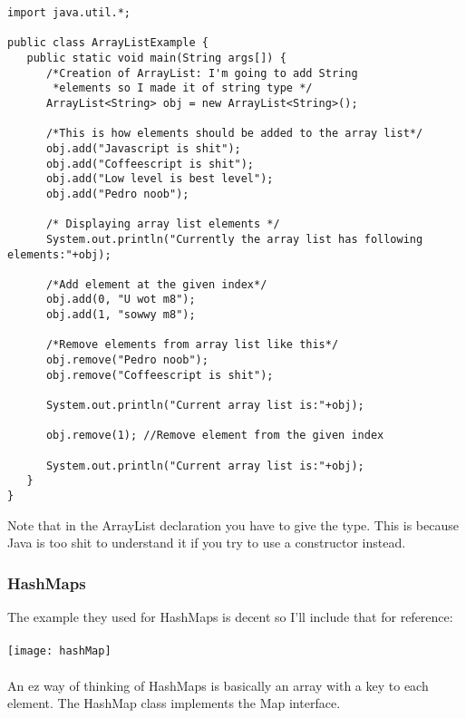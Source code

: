 \documentclass{article}
\begin{document}
\begin{lstlisting}
import java.util.*;

public class ArrayListExample {
   public static void main(String args[]) {
      /*Creation of ArrayList: I'm going to add String
       *elements so I made it of string type */
	  ArrayList<String> obj = new ArrayList<String>();

	  /*This is how elements should be added to the array list*/
	  obj.add("Javascript is shit");
	  obj.add("Coffeescript is shit");
	  obj.add("Low level is best level");
	  obj.add("Pedro noob");

	  /* Displaying array list elements */
	  System.out.println("Currently the array list has following elements:"+obj);

	  /*Add element at the given index*/
	  obj.add(0, "U wot m8");
	  obj.add(1, "sowwy m8");

	  /*Remove elements from array list like this*/
	  obj.remove("Pedro noob");
	  obj.remove("Coffeescript is shit");

	  System.out.println("Current array list is:"+obj);

	  obj.remove(1); //Remove element from the given index

	  System.out.println("Current array list is:"+obj);
   }
}
\end{lstlisting}

Note that in the ArrayList declaration you have to give the type. This is because Java is too shit to understand it if you try to use a constructor instead. 
\subsubsection{HashMaps}
The example they used for HashMaps is decent so I'll include that for reference:
\\\\
\texttt{[image: hashMap]}
\\\\
An ez way of thinking of HashMaps is basically an array with a key to each element. The HashMap class implements the Map interface.
\end{document}
